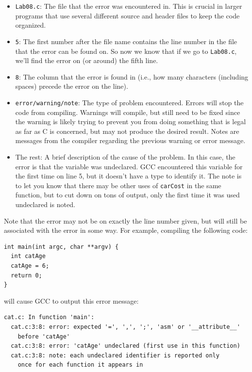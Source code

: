 \documentclass[12pt]{scrartcl}
\begin{document}
\begin{itemize}
  \item \texttt{Lab08.c}: The file that the error was encountered in.  
  	This is crucial in larger programs that use several different source and 
	header files to keep the code organized.  
  \item \texttt{5}: The first number after the file name contains 
	the line number in the file that the error can be found on.  So now we 
	know that if we go to \texttt{Lab08.c}, we'll find the error on 
	(or around) the fifth line.  

  \item \texttt{8}: The column that the error is found in (i.e., how 
	many characters (including spaces) precede the error on the line). 

  \item \texttt{error/warning/note}: The type of problem encountered.  
	Errors will stop the code from compiling.  Warnings will compile, but still 
	need to be fixed since the warning is likely trying to prevent you from 
	doing something that is legal as far as C is concerned, but may not 
	produce the desired result.  Notes are messages from the compiler 
	regarding the previous warning or error message.

  \item The rest: A brief description of the cause of the problem.  In this case, 
	the error is that the variable was undeclared.  GCC encountered this 
	variable for the first time on line 5, but it doesn't have a type to identify 
	it.  The note is to let you know that there may be other uses of 
	\texttt{carCost} in the same function, but to cut down on tons of 
	output, only the first time it was used undeclared is noted.   
\end{itemize}
	
Note that the error may not be on exactly the line number given, but will still 
be associated with the error in some way.  For example, compiling the 
following code:

\begin{verbatim}
int main(int argc, char **argv) {
  int catAge
  catAge = 6;
  return 0;
}
\end{verbatim}

will cause GCC to output this error message:

\begin{verbatim}
cat.c: In function 'main':
  cat.c:3:8: error: expected '=', ',', ';', 'asm' or '__attribute__' 
	before 'catAge'
  cat.c:3:8: error: 'catAge' undeclared (first use in this function)
  cat.c:3:8: note: each undeclared identifier is reported only 
	once for each function it appears in
\end{verbatim}
\end{document}
